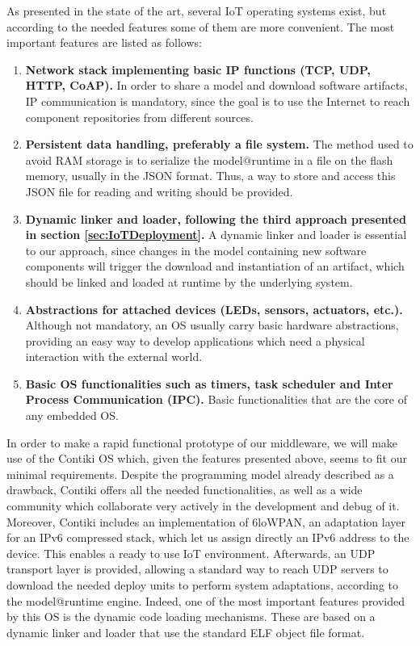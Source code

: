 As presented in the state of the art, several IoT operating systems exist, but according to the needed features some of them are more convenient.
The most important features are listed as follows:
\begin{enumerate}
	\item \textbf{Network stack implementing basic IP functions (TCP, UDP, HTTP, CoAP).} In order to share a model and download software artifacts, IP communication is mandatory, since the goal is to use the Internet to reach component repositories from different sources.
	\item \textbf{Persistent data handling, preferably a file system.} The method used to avoid RAM storage is to serialize the model@runtime in a file on the flash memory, usually in the JSON format. Thus, a way to store and access this JSON file for reading and writing should be provided.
	\item \textbf{Dynamic linker and loader, following the third approach presented in section \ref{sec:IoTDeployment}.} A dynamic linker and loader is essential to our approach, since changes in the model containing new software components will trigger the download and instantiation of an artifact, which should be linked and loaded at runtime by the underlying system.
	\item \textbf{Abstractions for attached devices (LEDs, sensors, actuators, etc.).} Although not mandatory, an OS usually carry basic hardware abstractions, providing an easy way to develop applications which need a physical interaction with the external world.
	\item \textbf{Basic OS functionalities such as timers, task scheduler and Inter Process Communication (IPC).} Basic functionalities that are the core of any embedded OS.
\end{enumerate}
In order to make a rapid functional prototype of our middleware, we will make use of the Contiki OS which, given the features presented above, seems to fit our minimal requirements.
Despite the programming model already described as a drawback, Contiki offers all the needed functionalities, as well as a wide community which collaborate very actively in the development and debug of it.
Moreover, Contiki includes an implementation of 6loWPAN\cite{rfc4944}, an adaptation layer for an IPv6 compressed stack, which let us assign directly an IPv6 address to the device.
This enables a ready to use IoT environment.
Afterwards, an UDP transport layer is provided, allowing a standard way to reach UDP servers to download the needed deploy units to perform system adaptations, according to the model@runtime engine.
Indeed, one of the most important features provided by this OS is the dynamic code loading mechanisms.
These are based on a dynamic linker and loader that use the standard ELF object file format\cite{dunkels06runtime}.

